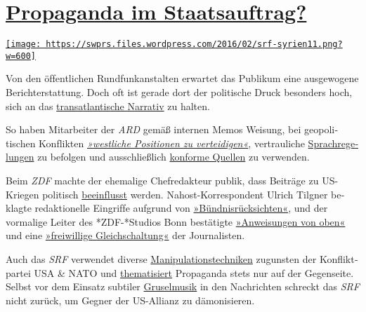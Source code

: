 \hypertarget{propaganda-im-staatsauftrag}{%
\section{\texorpdfstring{\href{https://swprs.org/2017/03/01/propaganda-im-staatsauftrag/}{Propaganda
im
Staatsauftrag?}}{Propaganda im Staatsauftrag?}}\label{propaganda-im-staatsauftrag}}

\href{https://swprs.org/2017/03/01/propaganda-im-staatsauftrag/}{\texttt{[image: https://swprs.files.wordpress.com/2016/02/srf-syrien11.png?w=600]}}

Von den öf‌fentlichen Rund­funk­an­stalten er­war­tet das Pu­bli­kum
eine aus­ge­wogene Bericht­er­stattung. Doch of‌t ist ge­rade dort der
politische Druck be­sonders hoch, sich an das
\href{https://swprs.org/das-gewuenschte-narrativ/}{trans­at­lan­tische
Narra­tiv} zu halten.

So haben Mitarbeiter der \emph{ARD} gemäß internen Memos Weisung, bei
geo­po­li­tischen Kon­f‌lik­ten
\emph{\href{https://www.heise.de/tp/features/Ukraine-Konflikt-ARD-Programmbeirat-bestaetigt-Publikumskritik-3367400.html}{»west­liche
Posi­tionen zu ver­tei­di­gen«}}, ver­trau­liche
\href{https://www.heise.de/tp/features/Die-vertraulichen-Sprachregelungen-der-ARD-3758887.html}{Sprach­­re­­ge­lungen}
zu be­fol­gen und aus­­schließ­­lich
\href{https://www.oxmoxhh.de/magazin/story-interview/oxmox-exklusiv-interview-mit-volker-braeutigam-friedhelm-klinkhammer/}{konforme
Quellen} zu ver­wen­den.

Beim \emph{ZDF} machte der ehe­ma­lige Chef­re­dakteur publik, dass
Bei­träge zu US-Kriegen poli­tisch
\href{https://www.youtube.com/watch?v=i2423aDq_hE}{be­ein­f‌‌lusst}
werden. Nahost-Kor­res­pon­dent Ulrich Tilgner be­klagte
re­dak­tio­nelle Ein­grif‌fe aufgrund von
\href{http://www.berliner-zeitung.de/korrespondent-ulrich-tilgner-sucht-mehr-distanz-zum-zdf--ich-fuehle-mich-eingeschraenkt--15870684}{»Bünd­nis­rück­sich­ten«},
und der vormalige Leiter des *ZDF-*Studios Bonn be­stä­tig­te
\href{https://propagandaschau.wordpress.com/2016/01/30/wolfgang-herles-es-gibt-in-den-oeffentlich-rechtlichen-anweisungen-von-oben/}{»An­wei­sungen
von oben«} und eine
\href{http://www.rolandtichy.de/daili-es-sentials/meinungsfreiheit-anordnung-zur-anpassung/}{»frei­willige
Gleich­schal­tung«} der Jour­na­lis­ten.

Auch das \emph{SRF} verwendet diverse
\href{https://swprs.org/srf-propaganda-analyse/}{Mani­pu­lations­tech­niken}
zugunsten der Konflikt­partei USA \& NATO und
\href{http://www.srf.ch/sendungen/srfglobal/propagandagruesse-aus-moskau-2}{thematisiert}
Propaganda stets nur auf der Gegenseite. Selbst vor dem Einsatz
sub­tiler
\href{http://www.srf.ch/play/tv/10vor10/video/warum-assad-bleibt?id=a6d267c9-52b3-470b-868e-95bb919a0b96}{Grusel­musik}
in den Nach­rich­ten schreckt das \emph{SRF} nicht zurück, um Gegner der
US-Allianz zu dämo­ni­sieren.

